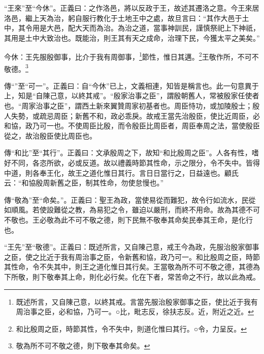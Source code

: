 {\noindent\shu{}\fzkt “王來”至“今休”。正義曰：之作洛邑，將以反政于王，故述其遷洛之意。今王來居洛邑，繼上天為治，躬自服行教化于土地王中之處，故旦言曰：“其作大邑于土中，其令用是大邑，配大天而為治。為治之道，當事神訓民，謹慎祭祀上下神祇，其用是土中大致治也。既能治，則王其有天之成命，治理下民，今獲太平之美矣。” \par}

今休：王先服殷御事，比介于我有周御事，\footnote{既述所言，又自陳己意，以終其戒。言當先服治殷家御事之臣，使比近于我有周治事之臣，必和協，乃可一。○比，毗志反，徐扶志反。近，附近之近。}節性，惟日其邁。\footnote{和比殷周之臣，時節其性，令不失中，則道化惟曰其行。○令，力呈反。}王敬作所，不可不敬德。\footnote{敬為所不可不敬之德，則下敬奉其命矣。}


{\noindent\zhuan{}\fzbyks 傳“”至“可一”。正義曰：自“今休”已上，文義相連，知皆是稱言也。此一句意異于上，知是“自陳己意，以終其戒”。“殷家治事之臣”，謂殷朝舊人，常被殷家任使者也。“周家治事之臣”，謂西土新來翼贊周家初基者也。周臣恃功，或加陵殷士；殷人失勢，或疏忌周臣；新舊不和，政必乖戾。故戒王當先治殷臣，使比近周臣，必和協，政乃可一也。不使周臣比殷，而令殷臣比周臣者，周臣奉周之法，當使殷臣從之，故治殷臣使比周臣也。 \par}

{\noindent\zhuan{}\fzbyks 傳“和比”至“其行”。正義曰：文承殷周之下，故知“和比殷周之臣”。人各有性，嗜好不同，各恣所欲，必或反道。故以禮義時節其性命，示之限分，令不失中。皆得中道，則各奉王化，故王之道化惟日其行。言日日當行之，日益遠也。顧氏云：“和協殷周新舊之臣，制其性命，勿使怠慢也。” \par}

{\noindent\zhuan{}\fzbyks 傳“敬為”至“命矣。”。正義曰：聖王為政，當使易從而難犯，故令行如流水，民從如順風。若使設難從之教，為易犯之令，雖迫以嚴刑，而終不用命。故為其德不可不敬也。王必敬為此不可不敬之德，則下民無不敬奉其命矣民奉其王命，是化行也。 \par}

{\noindent\shu{}\fzkt “王先”至“敬德”。正義曰：既述所言，又自陳己意，戒王今為政，先服治殷家御事之臣，使之比近于我有周治事之臣，令新舊和協，政乃可一。和比殷周之臣，時節其性命，令不失其中，則王之道化惟日其行矣。王當敬為所不可不敬之德，其德為下所敬，則下敬奉其上命，則化必行矣。化在下者，常苦命之不行，故以此為戒。 \par}

